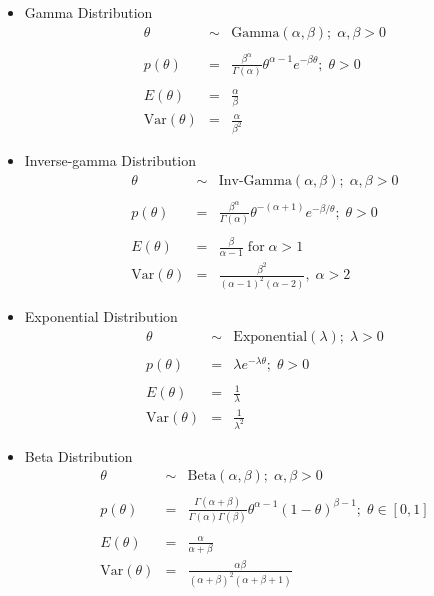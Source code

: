 \documentclass[10pt,a4paper]{article}
\begin{document}
\begin{itemize}
\item Gamma Distribution 
\begin{eqnarray*}
\theta &\sim& \mathrm{Gamma}(\alpha, \beta); \; \alpha, \beta > 0 \\\\
p(\theta) &=& \frac{\beta^{\alpha}}{\Gamma(\alpha)} \theta^{\alpha-1} e^{-\beta \theta}; \; \theta > 0\\\\
E(\theta) &=& \frac{\alpha}{\beta} \\
\mathrm{Var}(\theta) &=& \frac{\alpha}{\beta^2}
\end{eqnarray*}

\bigskip

\item Inverse-gamma Distribution 
\begin{eqnarray*}
\theta &\sim& \text{Inv-Gamma}(\alpha, \beta); \; \alpha, \beta > 0 \\\\
p(\theta) &=& \frac{\beta^{\alpha}}{\Gamma(\alpha)} \theta^{-(\alpha+1)} e^{-\beta / \theta}; \; \theta > 0\\\\
E(\theta) &=& \frac{\beta}{\alpha-1} \; \mathrm{for} \; \alpha>1 \\
\mathrm{Var}(\theta) &=& \frac{\beta^2}{(\alpha-1)^2(\alpha-2)}, \; \alpha > 2
\end{eqnarray*}

\bigskip

\item Exponential Distribution 
\begin{eqnarray*}
\theta &\sim& \mathrm{Exponential}(\lambda); \; \lambda > 0 \\\\
p(\theta) &=& \lambda e^{-\lambda \theta}; \; \theta > 0\\\\
E(\theta) &=& \frac{1}{\lambda} \\
\mathrm{Var}(\theta) &=& \frac{1}{\lambda^2}
\end{eqnarray*}

\bigskip

\item Beta Distribution 
\begin{eqnarray*}
\theta &\sim& \mathrm{Beta}(\alpha, \beta); \; \alpha, \beta > 0 \\\\
p(\theta) &=& \frac{\Gamma(\alpha+\beta)}{\Gamma(\alpha) \Gamma(\beta)} \theta^{\alpha-1} (1-\theta)^{\beta-1}; \; \theta \in [0,1] \\\\
E(\theta) &=& \frac{\alpha}{\alpha + \beta} \\
\mathrm{Var}(\theta) &=& \frac{\alpha \beta}{(\alpha+\beta)^2(\alpha+\beta+1)}
\end{eqnarray*}


\end{itemize}
\end{document}

